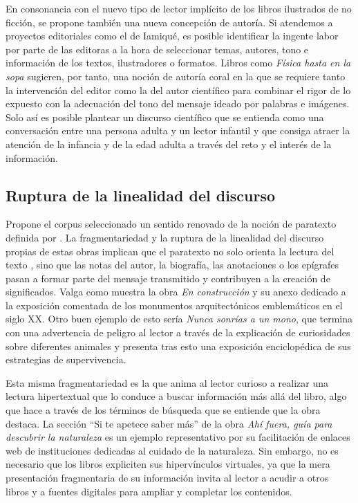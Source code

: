 \documentclass[spanish]{textolivre}
\begin{document}
En consonancia con el nuevo tipo de lector implícito de los libros ilustrados de no ficción, se propone también una nueva concepción de autoría. Si atendemos a proyectos editoriales como el de Iamiqué, es posible identificar la ingente labor por parte de las editoras a la hora de seleccionar temas, autores, tono e información de los textos, ilustradores o formatos. Libros como \textit{Física hasta en la sopa} sugieren, por tanto, una noción de autoría coral en la que se requiere tanto la intervención del editor como la del autor científico para combinar el rigor de lo expuesto con la adecuación del tono del mensaje ideado por palabras e imágenes. Solo así es posible plantear un discurso científico que se entienda como una conversación entre una persona adulta y un lector infantil y que consiga atraer la atención de la infancia y de la edad adulta a través del reto y el interés de la información.


\subsection{Ruptura de la linealidad del discurso}\label{sec-formato}
Propone el corpus seleccionado un sentido renovado de la noción de paratexto definida por \textcite{genette_palimpsestos:_1989}. La fragmentariedad y la ruptura de la linealidad del discurso propias de estas obras implican que el paratexto no solo orienta la lectura del texto \cite{lluch_epitextos_2015}, sino que las notas del autor, la biografía, las anotaciones o los epígrafes pasan a formar parte del mensaje transmitido y contribuyen a la creación de significados. Valga como muestra la obra \textit{En construcción} y su anexo dedicado a la exposición comentada de los monumentos arquitectónicos emblemáticos en el siglo XX. Otro buen ejemplo de esto sería \textit{Nunca sonrías a un mono}, que termina con una advertencia de peligro al lector a través de la explicación de curiosidades sobre diferentes animales y presenta tras esto una exposición enciclopédica de sus estrategias de supervivencia.

Esta misma fragmentariedad es la que anima al lector curioso a realizar una lectura hipertextual que lo conduce a buscar información más allá del libro, algo que hace a través de los términos de búsqueda que se entiende que la obra destaca. La sección “Si te apetece saber más” de la obra \textit{Ahí fuera, guía para descubrir la naturaleza} es un ejemplo representativo por su facilitación de enlaces web de instituciones dedicadas al cuidado de la naturaleza. Sin embargo, no es necesario que los libros expliciten sus hipervínculos virtuales, ya que la mera presentación fragmentaria de su información invita al lector a acudir a otros libros y a fuentes digitales para ampliar y completar los contenidos.
\end{document}
